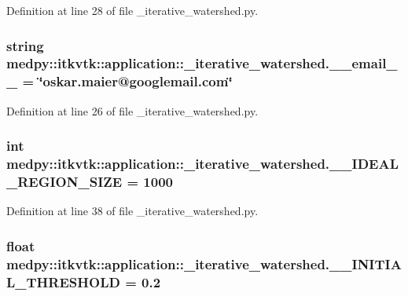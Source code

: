 Definition at line 28 of file \_\-iterative\_\-watershed.py.

\hypertarget{namespacemedpy_1_1itkvtk_1_1application_1_1__iterative__watershed_a4e6ae8a43a52d490b94e1716b9dc645e}{
\subsubsection[{\_\-\_\-email\_\-\_\-}]{\setlength{\rightskip}{0pt plus 5cm}string {\bf medpy::itkvtk::application::\_\-iterative\_\-watershed.\_\-\_\-email\_\-\_\-} = \char`\"{}oskar.maier@googlemail.com\char`\"{}}}
\label{namespacemedpy_1_1itkvtk_1_1application_1_1__iterative__watershed_a4e6ae8a43a52d490b94e1716b9dc645e}


Definition at line 26 of file \_\-iterative\_\-watershed.py.

\hypertarget{namespacemedpy_1_1itkvtk_1_1application_1_1__iterative__watershed_a15d17709c22dfc1b95cfe8f82e541713}{
\subsubsection[{\_\-\_\-IDEAL\_\-REGION\_\-SIZE}]{\setlength{\rightskip}{0pt plus 5cm}int {\bf medpy::itkvtk::application::\_\-iterative\_\-watershed.\_\-\_\-IDEAL\_\-REGION\_\-SIZE} = 1000}}
\label{namespacemedpy_1_1itkvtk_1_1application_1_1__iterative__watershed_a15d17709c22dfc1b95cfe8f82e541713}


Definition at line 38 of file \_\-iterative\_\-watershed.py.

\hypertarget{namespacemedpy_1_1itkvtk_1_1application_1_1__iterative__watershed_a129400336f58040c1f911269607edb52}{
\subsubsection[{\_\-\_\-INITIAL\_\-THRESHOLD}]{\setlength{\rightskip}{0pt plus 5cm}float {\bf medpy::itkvtk::application::\_\-iterative\_\-watershed.\_\-\_\-INITIAL\_\-THRESHOLD} = 0.2}}
\label{namespacemedpy_1_1itkvtk_1_1application_1_1__iterative__watershed_a129400336f58040c1f911269607edb52}


